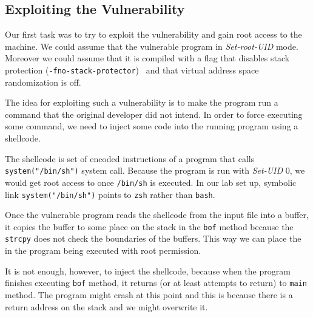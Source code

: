 \documentclass[12pt, a4paper, pdflatex]{article}
\begin{document}
\subsection{Exploiting the Vulnerability}

Our first task was to try to exploit the vulnerability and gain root access to the machine. We could assume that the vulnerable program in \emph{Set-root-UID} mode. Moreover we could assume that it is compiled with a flag that disables stack protection (\texttt{-fno-stack-protector})~\cite{gnu13} and that virtual address space randomization is off.

The idea for exploiting such a vulnerability is to make the program run a command that the original developer did not intend. In order to force executing some command, we need to inject some code into the running program using a shellcode. 

The shellcode is set of encoded instructions of a program that calls \texttt{system("/bin/sh")} system call. Because the program is run with \emph{Set-UID} 0, we would get root access to once \texttt{/bin/sh} is executed. In our lab set up, symbolic link \texttt{system("/bin/sh")} points to \texttt{zsh} rather than \texttt{bash}.

Once the vulnerable program reads the shellcode from the input file into a buffer, it copies the buffer to some place on the stack in the \texttt{bof} method because the \texttt{strcpy} does not check the boundaries of the buffers. This way we can place the in the program being executed with root permission.

It is not enough, however, to inject the shellcode, because when the program finishes executing \texttt{bof} method, it returns (or at least attempts to return) to \texttt{main} method. The program might crash at this point and this is because there is a return address on the stack and we might overwrite it.
\end{document}
